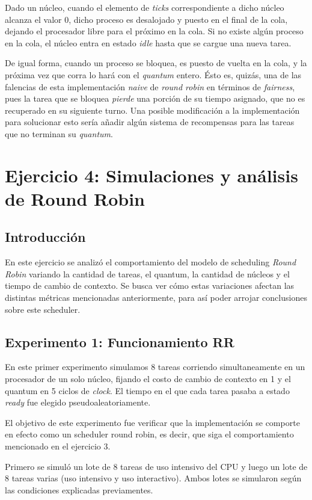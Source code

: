 \documentclass[a4paper]{article}
\begin{document}
Dado un núcleo, cuando el elemento de \textit{ticks} correspondiente a dicho
núcleo alcanza el valor $0$, dicho proceso es desalojado y puesto en el
final de la cola, dejando el procesador libre para el próximo en la cola.
Si no existe algún proceso en la cola, el núcleo entra en estado
\textit{idle} hasta que se cargue una nueva tarea.

De igual forma, cuando un proceso se bloquea, es puesto de vuelta en la
cola, y la próxima vez que corra lo hará con el \textit{quantum} entero.
Ésto es, quizás, una de las falencias de esta implementación \textit{naive}
de \textit{round robin} en términos de \textit{fairness}, pues la tarea que
se bloquea \textit{pierde} una porción de su tiempo asignado, que no es
recuperado en su siguiente turno. Una posible modificación a la
implementación para solucionar esto sería añadir algún sistema de
recompensas para las tareas que no terminan su \textit{quantum}.

\section{Ejercicio 4: Simulaciones y análisis de Round Robin}

\subsection{Introducción}
En este ejercicio se analizó el comportamiento del modelo de scheduling
\textit{Round Robin} variando la cantidad de tareas, el quantum, la cantidad
de núcleos y el tiempo de cambio de contexto. Se busca ver cómo estas
variaciones afectan las distintas métricas mencionadas anteriormente, para
así poder arrojar conclusiones sobre este scheduler.

\subsection{Experimento 1: Funcionamiento RR}
En este primer experimento simulamos 8 tareas corriendo simultaneamente en
un procesador de un solo núcleo, fijando el costo de cambio de contexto en 1
y el quantum en 5 ciclos de \textit{clock}. El tiempo en el que cada tarea
pasaba a estado \textit{ready} fue elegido pseudoaleatoriamente.

El objetivo de este experimento fue verificar que la implementación se
comporte en efecto como un scheduler round robin, es decir, que siga el
comportamiento mencionado en el ejercicio 3.

Primero se simuló un lote de 8 tareas de uso intensivo del CPU y luego un
lote de 8 tareas varias (uso intensivo y uso interactivo). Ambos lotes se
simularon según las condiciones explicadas previamentes.
\end{document}
